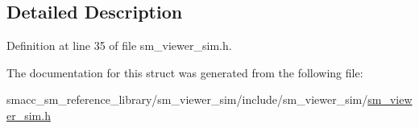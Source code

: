 \subsection{Detailed Description}


Definition at line 35 of file sm\+\_\+viewer\+\_\+sim.\+h.



The documentation for this struct was generated from the following file\+:\begin{DoxyCompactItemize}
\item 
smacc\+\_\+sm\+\_\+reference\+\_\+library/sm\+\_\+viewer\+\_\+sim/include/sm\+\_\+viewer\+\_\+sim/\hyperlink{sm__viewer__sim_8h}{sm\+\_\+viewer\+\_\+sim.\+h}\end{DoxyCompactItemize}
